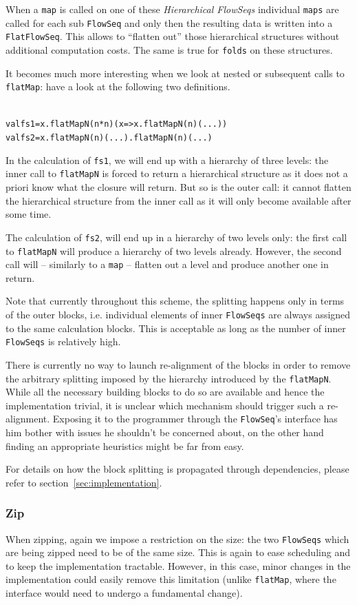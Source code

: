 \documentclass[runningheads,a4paper,fleqn]{llncs}
\begin{document}
When a \texttt{map} is called on one of these \emph{Hierarchical
  FlowSeqs} individual \texttt{maps} are called for each sub
\texttt{FlowSeq} and only then the resulting data is written into a
\texttt{FlatFlowSeq}. This allows to ``flatten out'' those
hierarchical structures without additional computation costs. The same
is true for \texttt{folds} on these structures.

It becomes much more interesting when we look at nested or subsequent
calls to \texttt{flatMap}: have a look at the following two
definitions.
\begin{alltt}
{\scriptsize
val fs1 = x.flatMapN(n*n)(x => x.flatMapN(n)( ... ))
val fs2 = x.flatMapN(n)(...).flatMapN(n)(...)
}
\end{alltt}
In the calculation of \texttt{fs1}, we will end up with a hierarchy of
three levels: the inner call to \texttt{flatMapN} is forced to return
a hierarchical structure as it does not a priori know what the closure
will return. But so is the outer call: it cannot flatten the hierarchical
structure from the inner call as it will only become available after
some time.

The calculation of \texttt{fs2}, will end up in a hierarchy of
two levels only: the first call to \texttt{flatMapN} will produce a 
hierarchy of two levels already. However, the second call will --
similarly to a \texttt{map} -- flatten out a level and produce another
one in return.

Note that currently throughout this scheme, the splitting happens only
in terms of the outer 
blocks, i.e. individual elements of inner \texttt{FlowSeqs} are always
assigned to the same calculation blocks. This is acceptable as long as
the number of inner \texttt{FlowSeqs} is relatively high.

There is currently no way to launch re-alignment of the blocks
in order to remove the arbitrary splitting imposed by the hierarchy
introduced by the \texttt{flatMapN}. While all the necessary building
blocks to do so are available and hence the implementation trivial, it
is unclear which mechanism should trigger such a
re-alignment. Exposing it to the programmer through the
\texttt{FlowSeq}'s interface has him bother with issues he shouldn't
be concerned about, on the other hand finding an appropriate
heuristics might be far from easy.

For details on how the block splitting is
propagated through dependencies, please refer to
section~\ref{sec:implementation}.

\subsubsection{Zip}
When zipping, again we impose a restriction on the size: 
the two \texttt{FlowSeqs} which are being zipped need to be of the same
size. This is again to ease scheduling and to keep the implementation
tractable. However, in 
this case, minor changes in the implementation could easily remove
this limitation (unlike \texttt{flatMap}, where the interface would
need to undergo a fundamental change).
\end{document}

